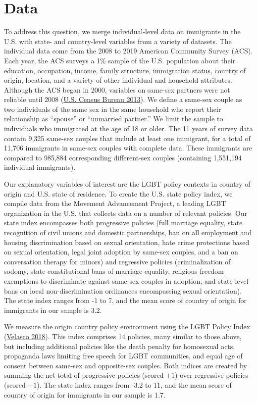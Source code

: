 \documentclass[
  11pt,
]{article}
\begin{document}
\hypertarget{data}{%
\section{Data}\label{data}}

To address this question, we merge individual-level data on immigrants in the U.S. with state- and country-level variables from a variety of datasets. The individual data come from the 2008 to 2019 American Community Survey (ACS). Each year, the ACS surveys a 1\% sample of the U.S. population about their education, occupation, income, family structure, immigration status, country of origin, location, and a variety of other individual and household attributes. Although the ACS began in 2000, variables on same-sex partners were not reliable until 2008 (\protect\hyperlink{ref-u.s.censusbureau_2013}{U.S. Census Bureau 2013}). We define a same-sex couple as two individuals of the same sex in the same household who report their relationship as ``spouse'' or ``unmarried partner.'' We limit the sample to individuals who immigrated at the age of 18 or older. The 11 years of survey data contain 9,325 same-sex couples that include at least one immigrant, for a total of 11,706 immigrants in same-sex couples with complete data. These immigrants are compared to 985,884 corresponding different-sex couples (containing 1,551,194 individual immigrants).

Our explanatory variables of interest are the LGBT policy contexts in country of origin and U.S. state of residence. To create the U.S. state policy index, we compile data from the Movement Advancement Project, a leading LGBT organization in the U.S. that collects data on a number of relevant policies. Our state index encompasses both progressive policies (full marriage equality, state recognition of civil unions and domestic partnerships, ban on all employment and housing discrimination based on sexual orientation, hate crime protections based on sexual orientation, legal joint adoption by same-sex couples, and a ban on conversation therapy for minors) and regressive policies (criminalization of sodomy, state constitutional bans of marriage equality, religious freedom exemptions to discriminate against same-sex couples in adoption, and state-level bans on local non-discrimination ordinances encompassing sexual orientation). The state index ranges from -1 to 7, and the mean score of country of origin for immigrants in our sample is 3.2.

We measure the origin country policy environment using the LGBT Policy Index (\protect\hyperlink{ref-velasco_2018}{Velasco 2018}). This index comprises 14 policies, many similar to those above, but including additional policies like the death penalty for homosexual acts, propaganda laws limiting free speech for LGBT communities, and equal age of consent between same-sex and opposite-sex couples. Both indices are created by summing the net total of progressive policies (scored \(+1\)) over regressive policies (scored \(-1\)). The state index ranges from -3.2 to 11, and the mean score of country of origin for immigrants in our sample is 1.7.
\end{document}
